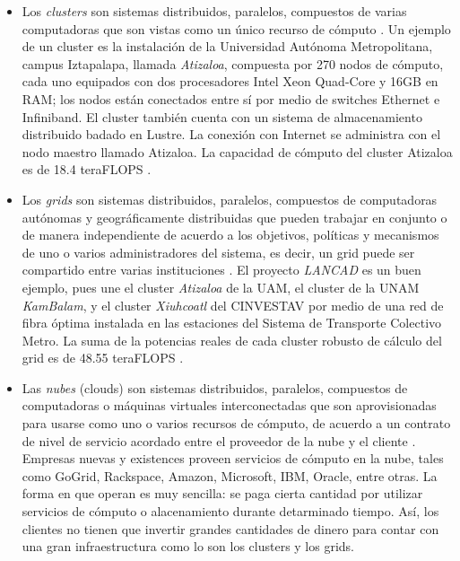 \documentclass{article}
\begin{document}
\begin{itemize}
\item Los \emph{clusters} son sistemas distribuidos, paralelos, compuestos de varias computadoras que son vistas como un único recurso de cómputo \cite{buyya2009cloud}. Un ejemplo de un cluster es la instalación de la Universidad Autónoma Metropolitana, campus Iztapalapa, llamada \emph{Atizaloa}, compuesta por 270 nodos de cómputo, cada uno equipados con dos procesadores Intel Xeon Quad-Core y 16GB en RAM; los nodos están conectados entre sí por medio de switches Ethernet e Infiniband. El cluster también cuenta con un sistema de almacenamiento distribuido badado en Lustre. La conexión con Internet se administra con el nodo maestro llamado Atizaloa. La capacidad de cómputo del cluster Atizaloa es de 18.4 teraFLOPS \cite{uamz2013tizaloa}.

\item Los \emph{grids} son sistemas distribuidos, paralelos, compuestos de computadoras autónomas y geográficamente distribuidas que pueden trabajar en conjunto o de manera independiente de acuerdo a los objetivos, políticas y mecanismos de uno o varios administradores del sistema, es decir, un grid puede ser compartido entre varias instituciones \cite{buyya2009cloud}. El proyecto \emph{LANCAD} es un buen ejemplo, pues une el cluster \emph{Atizaloa} de la UAM, el cluster de la UNAM \emph{KamBalam}, y el cluster \emph{Xiuhcoatl} del CINVESTAV por medio de una red de fibra óptima instalada en las estaciones del Sistema de Transporte Colectivo Metro. La suma de la potencias reales de cada cluster robusto de cálculo del grid es de 48.55 teraFLOPS \cite{lancad2013xiuhcoatl}.

\item Las \emph{nubes} (clouds) son sistemas distribuidos, paralelos, compuestos de computadoras o máquinas virtuales interconectadas que son aprovisionadas para usarse como uno o varios recursos de cómputo, de acuerdo a un contrato de nivel de servicio acordado entre el proveedor de la nube y el cliente \cite{buyya2009cloud}. Empresas nuevas y existences proveen servicios de cómputo en la nube, tales como GoGrid, Rackspace, Amazon, Microsoft, IBM, Oracle, entre otras. La forma en que operan es muy sencilla: se paga cierta cantidad por utilizar servicios de cómputo o alacenamiento durante detarminado tiempo. Así, los clientes no tienen que invertir grandes cantidades de dinero para contar con una gran infraestructura como lo son los clusters y los grids.
\end{itemize}
\end{document}
